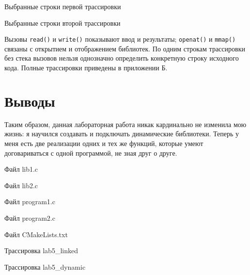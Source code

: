 \documentclass[12pt, a4paper]{article}
\begin{document}
\begin{listingblock}{Выбранные строки первой трассировки}
\end{listingblock}

\begin{listingblock}{Выбранные строки второй трассировки}
\end{listingblock}

Вызовы \texttt{read()} и \texttt{write()} показывают ввод и результаты; \texttt{openat()} и \texttt{mmap()} связаны с открытием и отображением библиотек. По одним строкам трассировки без стека вызовов нельзя однозначно определить конкретную строку исходного кода. Полные трассировки приведены в приложении Б.

\section{Выводы}

Таким образом, данная лабораторная работа никак кардинально не изменила мою жизнь: я научился создавать и подключать динамические библиотеки. Теперь у меня есть две реализации одних и тех же функций, которые умеют договариваться с одной программой, не зная друг о друге.

\begin{listingblock}{Файл lib1.c}
\end{listingblock}
\begin{listingblock}{Файл lib2.c}
\end{listingblock}
\begin{listingblock}{Файл program1.c}
\end{listingblock}
\begin{listingblock}{Файл program2.c}
\end{listingblock}
\begin{listingblock}{Файл CMakeLists.txt}
\end{listingblock}

\begin{listingblock}{Трассировка lab5\_linked}
\end{listingblock}
\begin{listingblock}{Трассировка lab5\_dynamic}
\end{listingblock}
\end{document}
